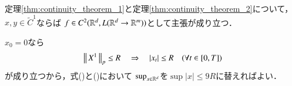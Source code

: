 	\begin{screen}
		\begin{cor}
			定理\ref{thm:continuity_theorem_1}と定理\ref{thm:continuity_theorem_2}について，
			$x,y \in \tilde{C}^1$ならば
			$f \in C^2(\mathbb{R}^d,L(\mathbb{R}^d \rightarrow \mathbb{R}^m))$として主張が成り立つ．
		\end{cor}
	\end{screen}
	
	\begin{prf}
		$x_0 = 0$なら
		\begin{align}
			\left\|\, X^1\, \right\|_{p} \leq R \quad \Rightarrow \quad |x_t| \leq R \quad (\forall t \in [0,T])
		\end{align}
		が成り立つから，式()と()において
		$\operatorname*{sup}_{x\in\mathbb{R}^d} $を$\sup{|x| \leq 9R}$に替えればよい．
		\QED
	\end{prf}